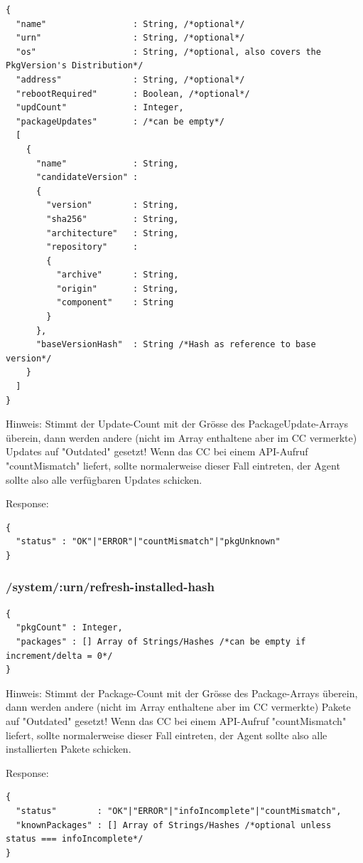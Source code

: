 \begin{verbatim}
{
  "name"                 : String, /*optional*/
  "urn"                  : String, /*optional*/
  "os"                   : String, /*optional, also covers the PkgVersion's Distribution*/
  "address"              : String, /*optional*/
  "rebootRequired"       : Boolean, /*optional*/
  "updCount"             : Integer,
  "packageUpdates"       : /*can be empty*/
  [
    {
      "name"             : String,
      "candidateVersion" :
      {
        "version"        : String,
        "sha256"         : String,
        "architecture"   : String,
        "repository"     :
        {
          "archive"      : String,
          "origin"       : String,
          "component"    : String
        }
      },
      "baseVersionHash"  : String /*Hash as reference to base version*/
    }
  ]
}
\end{verbatim}

Hinweis: Stimmt der Update-Count mit der Grösse des PackageUpdate-Arrays überein, dann werden andere (nicht im Array enthaltene aber im CC vermerkte) Updates auf "Outdated" gesetzt! Wenn das CC bei einem API-Aufruf "countMismatch" liefert, sollte normalerweise dieser Fall eintreten, der Agent sollte also alle verfügbaren Updates schicken.

Response: 

\begin{verbatim}
{
  "status" : "OK"|"ERROR"|"countMismatch"|"pkgUnknown" 
}
\end{verbatim}

\subsubsection{/system/:urn/refresh-installed-hash}

\begin{verbatim}
{
  "pkgCount" : Integer,
  "packages" : [] Array of Strings/Hashes /*can be empty if increment/delta = 0*/
}
\end{verbatim}

Hinweis: Stimmt der Package-Count mit der Grösse des Package-Arrays überein, dann werden andere (nicht im Array enthaltene aber im CC vermerkte) Pakete auf "Outdated" gesetzt! Wenn das CC bei einem API-Aufruf "countMismatch" liefert, sollte normalerweise dieser Fall eintreten, der Agent sollte also alle installierten Pakete schicken.

Response: 

\begin{verbatim}
{
  "status"        : "OK"|"ERROR"|"infoIncomplete"|"countMismatch",
  "knownPackages" : [] Array of Strings/Hashes /*optional unless status === infoIncomplete*/
}
\end{verbatim}


